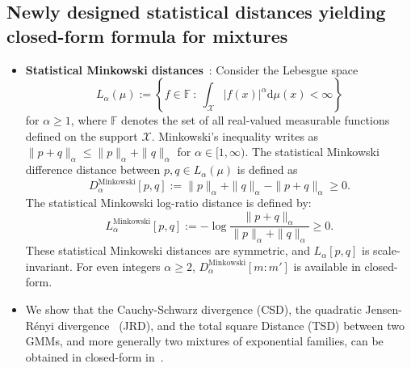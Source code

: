 \documentclass[11pt]{article}
\def\st{\ :\ }
\def\bbF{\mathbb{F}}
\def\eqdef{:=}
\def\dmu{\mathrm{d}\mu}
\def\calX{\mathcal{X}}
\def\calX{\mathcal{X}}
\def\dmu{\mathrm{d}\mu}
\begin{document}


\subsection{Newly designed statistical distances yielding closed-form formula for mixtures}\label{sec:mix:newdist}


\begin{itemize}
	\item {\bf Statistical Minkowski distances}~\cite{StatMinkGMM-2019}:
	Consider the   Lebesgue space 
	$$
	L_\alpha(\mu)  \eqdef \left\{ f\in \bbF \st  \int_\calX |f(x)|^\alpha \dmu(x) <\infty \right\}
	$$  
	for $\alpha\geq 1$, where   $\bbF$ denotes the set of all real-valued measurable functions defined on the support $\calX$. Minkowski's inequality writes as
$\|p+q\|_\alpha \leq \|p\|_\alpha+\|q\|_\alpha$ for $\alpha\in [1,\infty)$.
 The statistical Minkowski difference distance between $p,q\in L_\alpha(\mu)$ is defined as
\begin{equation}
D_\alpha^{\mathrm{Minkowski}}[p,q] \eqdef \|p\|_\alpha+\|q\|_\alpha - \|p+q\|_\alpha\geq 0.
\end{equation}
The statistical Minkowski log-ratio distance is defined by:
\begin{equation}
L_\alpha^{\mathrm{Minkowski}}[p,q] \eqdef -\log \frac{\|p+q\|_\alpha}{\|p\|_\alpha+\|q\|_\alpha}\geq 0.
\end{equation}
These statistical Minkowski distances are symmetric, and $L_\alpha[p,q]$ is scale-invariant.
For even integers $\alpha\geq 2$, $D_\alpha^{\mathrm{Minkowski}}[m:m']$ is available in closed-form.


\item We show that the Cauchy-Schwarz divergence (CSD), the quadratic Jensen-R\'enyi divergence~\cite{JRGMM-2009} (JRD), and the total square Distance (TSD) between two GMMs, and more generally two mixtures of exponential families, can be obtained in closed-form in~\cite{nielsen2012closed}.
\end{itemize}



%
%
%
%
\end{document}
